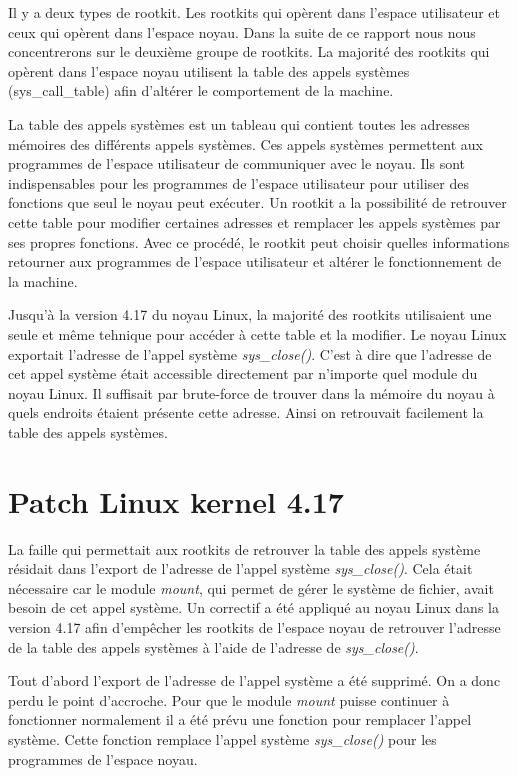 \documentclass[journal, a4paper]{IEEEtran}
\begin{document}
Il y a deux types de rootkit. Les rootkits qui opèrent dans l'espace utilisateur et ceux qui opèrent dans l'espace noyau. Dans la suite de ce rapport nous nous concentrerons sur le deuxième groupe de rootkits. La majorité des rootkits qui opèrent dans l'espace noyau utilisent la table des appels systèmes (sys\_call\_table) afin d'altérer le comportement de la machine.

La table des appels systèmes est un tableau qui contient toutes les adresses mémoires des différents appels systèmes. Ces appels systèmes permettent aux programmes de l'espace utilisateur de communiquer avec le noyau. Ils sont indispensables pour les programmes de l'espace utilisateur pour utiliser des fonctions que seul le noyau peut exécuter. Un rootkit a la possibilité de retrouver cette table pour modifier certaines adresses et remplacer les appels systèmes par ses propres fonctions. Avec ce procédé, le rootkit peut choisir quelles informations retourner aux programmes de l'espace utilisateur et altérer le fonctionnement de la machine.

Jusqu'à la version 4.17 du noyau Linux, la majorité des rootkits utilisaient une seule et même tehnique pour accéder à cette table et la modifier. Le noyau Linux exportait l'adresse de l'appel système \textit{sys\_close()}. C'est à dire que l'adresse de cet appel système était accessible directement par n'importe quel module du noyau Linux. Il suffisait par brute-force de trouver dans la mémoire du noyau à quels endroits étaient présente cette adresse. Ainsi on retrouvait facilement la table des appels systèmes.

\section{Patch Linux kernel 4.17}

La faille qui permettait aux rootkits de retrouver la table des appels système résidait dans l'export de l'adresse de l'appel système \textit{sys\_close()}. Cela était nécessaire car le module \textit{mount}, qui permet de gérer le système de fichier, avait besoin de cet appel système. Un correctif a été appliqué au noyau Linux dans la version 4.17 afin d'empêcher les rootkits de l'espace noyau de retrouver l'adresse de la table des appels systèmes à l'aide de l'adresse de \textit{sys\_close()}. 

Tout d'abord l'export de l'adresse de l'appel système a été supprimé. On a donc perdu le point d'accroche. Pour que le module \textit{mount} puisse continuer à fonctionner normalement il a été prévu une fonction pour remplacer l'appel système. Cette fonction remplace l'appel système \textit{sys\_close()} pour les programmes de l'espace noyau.
\end{document}
